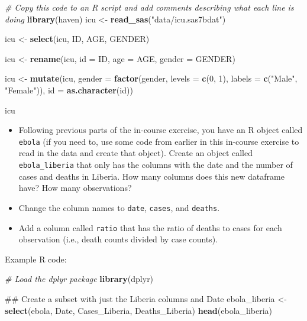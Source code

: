 \documentclass[]{book}
\makeatletter
\newenvironment{Shaded}{\begin{snugshade}}{\end{snugshade}}
\newcommand{\KeywordTok}[1]{\textcolor[rgb]{0.13,0.29,0.53}{\textbf{#1}}}
\newcommand{\DataTypeTok}[1]{\textcolor[rgb]{0.13,0.29,0.53}{#1}}
\newcommand{\DecValTok}[1]{\textcolor[rgb]{0.00,0.00,0.81}{#1}}
\newcommand{\StringTok}[1]{\textcolor[rgb]{0.31,0.60,0.02}{#1}}
\newcommand{\CommentTok}[1]{\textcolor[rgb]{0.56,0.35,0.01}{\textit{#1}}}
\newcommand{\NormalTok}[1]{#1}
\providecommand{\tightlist}{%
  \setlength{\itemsep}{0pt}\setlength{\parskip}{0pt}}
\newenvironment{kframe}{%
\medskip{}
\setlength{\fboxsep}{.8em}
 \def\at@end@of@kframe{}%
 \ifinner\ifhmode%
  \def\at@end@of@kframe{\end{minipage}}%
  \begin{minipage}{\columnwidth}%
 \fi\fi%
 \def\FrameCommand##1{\hskip\@totalleftmargin \hskip-\fboxsep
 \colorbox{shadecolor}{##1}\hskip-\fboxsep
     \hskip-\linewidth \hskip-\@totalleftmargin \hskip\columnwidth}%
 \MakeFramed {\advance\hsize-\width
   \@totalleftmargin\z@ \linewidth\hsize
   \@setminipage}}%
 {\par\unskip\endMakeFramed%
 \at@end@of@kframe}
\renewenvironment{Shaded}{\begin{kframe}}{\end{kframe}}
\theoremstyle{definition}
\theoremstyle{definition}
\theoremstyle{definition}
\theoremstyle{remark}
\makeatother
\begin{document}
\begin{Shaded}
\begin{Highlighting}[]
\CommentTok{# Copy this code to an R script and add comments describing what each line is doing}
\KeywordTok{library}\NormalTok{(haven)}
\NormalTok{icu <-}\StringTok{ }\KeywordTok{read_sas}\NormalTok{(}\StringTok{"data/icu.sas7bdat"}\NormalTok{)}

\NormalTok{icu <-}\StringTok{ }\KeywordTok{select}\NormalTok{(icu, ID, AGE, GENDER)}

\NormalTok{icu <-}\StringTok{ }\KeywordTok{rename}\NormalTok{(icu, }
              \DataTypeTok{id =}\NormalTok{ ID,}
              \DataTypeTok{age =}\NormalTok{ AGE,}
              \DataTypeTok{gender =}\NormalTok{ GENDER)}

\NormalTok{icu <-}\StringTok{ }\KeywordTok{mutate}\NormalTok{(icu,}
              \DataTypeTok{gender =} \KeywordTok{factor}\NormalTok{(gender, }\DataTypeTok{levels =} \KeywordTok{c}\NormalTok{(}\DecValTok{0}\NormalTok{, }\DecValTok{1}\NormalTok{), }\DataTypeTok{labels =} \KeywordTok{c}\NormalTok{(}\StringTok{"Male"}\NormalTok{, }\StringTok{"Female"}\NormalTok{)),}
              \DataTypeTok{id =} \KeywordTok{as.character}\NormalTok{(id))}

\NormalTok{icu}
\end{Highlighting}
\end{Shaded}

\begin{itemize}
\tightlist
\item
  Following previous parts of the in-course exercise, you have an R
  object called \texttt{ebola} (if you need to, use some code from
  earlier in this in-course exercise to read in the data and create that
  object). Create an object called \texttt{ebola\_liberia} that only has
  the columns with the date and the number of cases and deaths in
  Liberia. How many columns does this new dataframe have? How many
  observations?
\item
  Change the column names to \texttt{date}, \texttt{cases}, and
  \texttt{deaths}.
\item
  Add a column called \texttt{ratio} that has the ratio of deaths to
  cases for each observation (i.e., death counts divided by case
  counts).
\end{itemize}

Example R code:

\begin{Shaded}
\begin{Highlighting}[]
\CommentTok{# Load the dplyr package}
\KeywordTok{library}\NormalTok{(dplyr)}

\NormalTok{## Create a subset with just the Liberia columns and Date}
\NormalTok{ebola_liberia <-}\StringTok{ }\KeywordTok{select}\NormalTok{(ebola, Date, Cases_Liberia, Deaths_Liberia)}
\KeywordTok{head}\NormalTok{(ebola_liberia)}
\end{Highlighting}
\end{Shaded}
\end{document}
